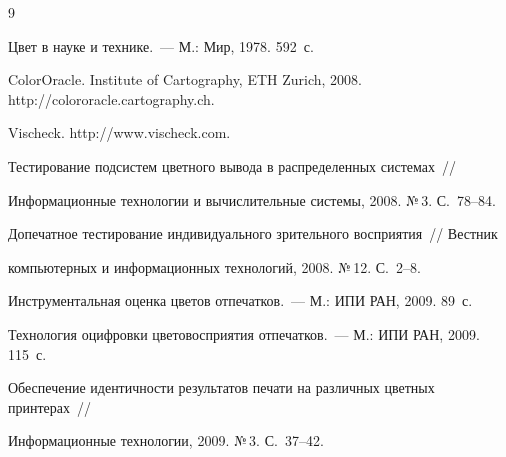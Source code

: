 {\frenchspacing\small




\begin{thebibliography}{9}









Цвет в науке и технике.~--- М.: Мир, 1978.  592~с.







ColorOracle. Institute of Cartography, ETH Zurich, 2008. {\sf http://colororacle.cartography.ch}.







Vischeck. {\sf http://www.vischeck.com}.









Тестирование подсистем цветного вывода в распределенных системах~//


Информационные технологии и вычислительные системы, 2008. №\,3. С.~78--84.









Допечатное тестирование индивидуального зрительного восприятия~// Вестник


компьютерных и информационных технологий, 2008. №\,12. С.~2--8.









Инструментальная оценка цветов отпечатков.~--- М.: ИПИ РАН, 2009.  89~с.









Технология оциф\-ров\-ки цветовосприятия отпечатков.~--- М.: ИПИ РАН, 2009. 115~с.









Обеспечение идентичности результатов печати на различных цветных принтерах~//


Информационные технологии, 2009. №\,3. С.~37--42.


\end{thebibliography}


}


